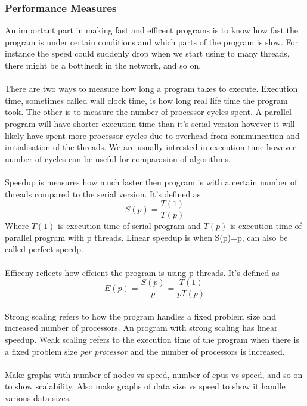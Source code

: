 \documentclass[10pt,a4paper]{article}
\begin{document}
\subsubsection{Performance Measures}
An important part in making fast and efficent programs is to know how fast the program is under certain conditions and which parts of the program is slow. For instance the speed could suddenly drop when we start using to many threads, there might be a bottlneck in the network, and so on.\\
\\
There are two ways to measure how long a program takes to execute. Execution time, sometimes called wall clock time, is how long real life time the program took. The other is to measure the number of processor cycles spent. A parallel program will have shorter execution time than it's serial version however it will likely have spent more processor cycles due to overhead from communcation and initialisation of the threads. We are usually intrested in execution time however number of cycles can be useful for comparasion of algorithms.\\
\\
Speedup is measures how much faster then program is with a certain number of threads compared to the serial version. It's defined as
$$S(p)=\frac{T(1)}{T(p)}$$
Where $T(1)$ is execution time of serial program and $T(p)$ is execution time of parallel program with p threads. Linear speedup is when S(p)=p, can also be called perfect speedp.\\
\\
Efficeny reflects how effcient the program is using p threads. It's defined as
$$E(p)=\frac{S(p)}{p}=\frac{T(1)}{pT(p)}$$
\\
Strong scaling refers to how the program handles a fixed problem size and increased number of processors. An program with strong scaling has linear speedup. Weak scaling refers to the execution time of the program when there is a fixed problem size \emph{per processor} and the number of processors is increased.\cite{cuda_best_practice}\\
\\
Make graphs with number of nodes vs speed, number of cpus vs speed, and so on to show scalability. Also make graphs of data size vs speed to show it handle various data sizes.
\end{document}
